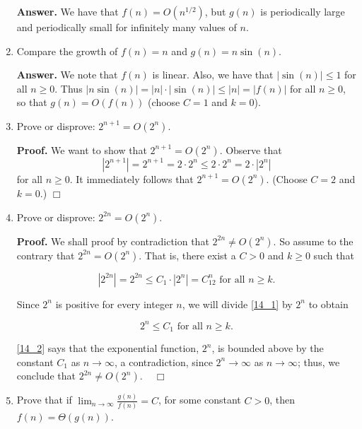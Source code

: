 \documentclass[9pt]{article}
\newcommand{\qed}{\hfill \ensuremath{\Box}}
\begin{document}
\begin{enumerate}
      \textbf{Answer.} We have that $f(n) = O(n^{1/2})$, but $g(n)$ is
      periodically large and periodically small for infinitely many values of
      $n$.
   \item Compare the growth of $f(n) = n$ and $g(n) = n\sin(n)$.

      \textbf{Answer.} We note that $f(n)$ is linear. Also, we have that
      $|\sin(n)| \le 1$ for all $n \ge 0$. Thus
      $|n\sin(n)| = |n| \cdot |\sin(n)| \le |n| = |f(n)|$ for all $n \ge 0$,
      so that $g(n) = O(f(n))$ (choose $C = 1$ and $k = 0$).
   \item Prove or disprove: $2^{n+1} = O(2^n)$.

      \textbf{Proof.} We want to show that $2^{n+1} = O(2^n)$. Observe that
      $$|2^{n+1}| = 2^{n+1} = 2 \cdot 2^n \le 2 \cdot 2^n = 2 \cdot |2^n|$$
      for all $n \ge 0$. It immediately follows that $2^{n+1} = O(2^n)$.
      (Choose $C = 2$ and $k = 0$.) \qed
   \item Prove or disprove: $2^{2n} = O(2^n)$.

      \textbf{Proof.} We shall proof by contradiction that $2^{2n} \neq O(2^n)$.
      So assume to the contrary that $2^{2n} = O(2^n)$. That is, there exist a
      $C > 0$ and $k \ge 0$ such that

      \begin{equation} \label{14_1}
         |2^{2n}| = 2^{2n} \le C_1 \cdot |2^n| = C_12^n \text{ for all }
            n \ge k.
      \end{equation}

      Since $2^n$ is positive for every integer $n$, we will divide \eqref{14_1}
      by $2^n$ to obtain

      \begin{equation} \label{14_2}
         2^n \le C_1 \text{ for all } n \ge k.
      \end{equation}

      \eqref{14_2} says that the exponential function, $2^n$, is bounded above
      by the constant $C_1$ as $n \rightarrow \infty$, a contradiction, since
      $2^n \rightarrow \infty$ as $n \rightarrow \infty$; thus, we conclude that
      $2^{2n} \neq O(2^n)$. \mbox{ } \qed
   \item Prove that if $\lim_{n\rightarrow\infty}\frac{g(n)}{f(n)} = C$, for
         some constant $C > 0$, then $f(n) = \Theta(g(n))$.


\end{enumerate}
\end{document}
